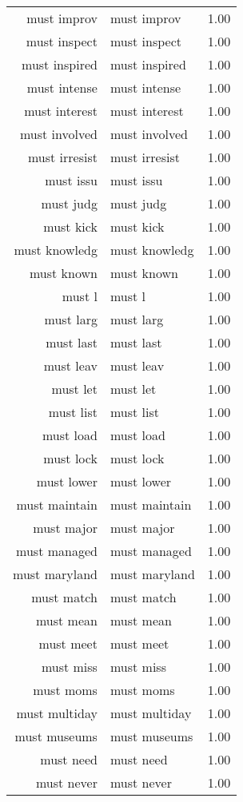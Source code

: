 \begin{table}[ht]
\begin{tabular}{rlr}
  must improv & must improv & 1.00 \\ 
  must inspect & must inspect & 1.00 \\ 
  must inspired & must inspired & 1.00 \\ 
  must intense & must intense & 1.00 \\ 
  must interest & must interest & 1.00 \\ 
  must involved & must involved & 1.00 \\ 
  must irresist & must irresist & 1.00 \\ 
  must issu & must issu & 1.00 \\ 
  must judg & must judg & 1.00 \\ 
  must kick & must kick & 1.00 \\ 
  must knowledg & must knowledg & 1.00 \\ 
  must known & must known & 1.00 \\ 
  must l & must l & 1.00 \\ 
  must larg & must larg & 1.00 \\ 
  must last & must last & 1.00 \\ 
  must leav & must leav & 1.00 \\ 
  must let & must let & 1.00 \\ 
  must list & must list & 1.00 \\ 
  must load & must load & 1.00 \\ 
  must lock & must lock & 1.00 \\ 
  must lower & must lower & 1.00 \\ 
  must maintain & must maintain & 1.00 \\ 
  must major & must major & 1.00 \\ 
  must managed & must managed & 1.00 \\ 
  must maryland & must maryland & 1.00 \\ 
  must match & must match & 1.00 \\ 
  must mean & must mean & 1.00 \\ 
  must meet & must meet & 1.00 \\ 
  must miss & must miss & 1.00 \\ 
  must moms & must moms & 1.00 \\ 
  must multiday & must multiday & 1.00 \\ 
  must museums & must museums & 1.00 \\ 
  must need & must need & 1.00 \\ 
  must never & must never & 1.00 \\ 

\end{tabular}
\end{table}
